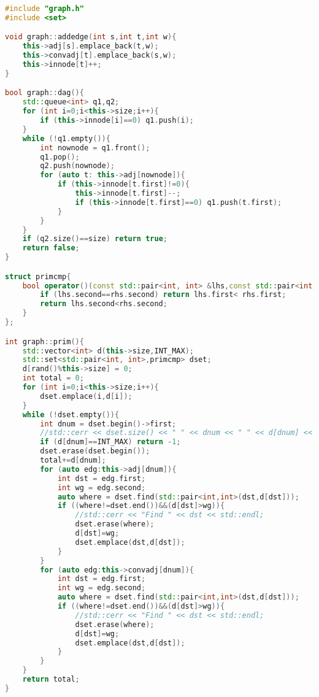 \documentclass{article}
\begin{document}
\begin{lstlisting}[title=graph.cpp,language=C++]
#include "graph.h"
#include <set>

void graph::addedge(int s,int t,int w){
    this->adj[s].emplace_back(t,w);
    this->convadj[t].emplace_back(s,w);
    this->innode[t]++;
}

bool graph::dag(){
    std::queue<int> q1,q2;
    for (int i=0;i<this->size;i++){
        if (this->innode[i]==0) q1.push(i);
    }
    while (!q1.empty()){
        int nownode = q1.front();
        q1.pop();
        q2.push(nownode);
        for (auto t: this->adj[nownode]){
            if (this->innode[t.first]!=0){
                this->innode[t.first]--;
                if (this->innode[t.first]==0) q1.push(t.first);
            }
        }
    }
    if (q2.size()==size) return true;
    return false;
}

struct primcmp{
    bool operator()(const std::pair<int, int> &lhs,const std::pair<int, int> &rhs){
        if (lhs.second==rhs.second) return lhs.first< rhs.first;
        return lhs.second<rhs.second;
    }
};

int graph::prim(){
    std::vector<int> d(this->size,INT_MAX);
    std::set<std::pair<int, int>,primcmp> dset;
    d[rand()%this->size] = 0;
    int total = 0;
    for (int i=0;i<this->size;i++){
        dset.emplace(i,d[i]);
    }
    while (!dset.empty()){
        int dnum = dset.begin()->first;
        //std::cerr << dset.size() << " " << dnum << " " << d[dnum] << std::endl;
        if (d[dnum]==INT_MAX) return -1;
        dset.erase(dset.begin());
        total+=d[dnum];
        for (auto edg:this->adj[dnum]){
            int dst = edg.first;
            int wg = edg.second;
            auto where = dset.find(std::pair<int,int>(dst,d[dst]));
            if ((where!=dset.end())&&(d[dst]>wg)){
                //std::cerr << "Find " << dst << std::endl;
                dset.erase(where);
                d[dst]=wg;
                dset.emplace(dst,d[dst]);
            }
        }
        for (auto edg:this->convadj[dnum]){
            int dst = edg.first;
            int wg = edg.second;
            auto where = dset.find(std::pair<int,int>(dst,d[dst]));
            if ((where!=dset.end())&&(d[dst]>wg)){
                //std::cerr << "Find " << dst << std::endl;
                dset.erase(where);
                d[dst]=wg;
                dset.emplace(dst,d[dst]);
            }
        }
    }
    return total;
}
\end{lstlisting}
\end{document}

